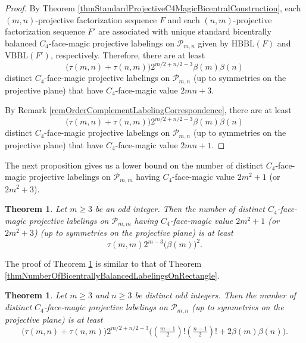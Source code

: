 \documentclass[12pt]{amsart}
\theoremstyle{definition}
\theoremstyle{plain}
\newtheorem{theorem}[definition]{Theorem}
\begin{document}
\begin{proof}
  By Theorem \ref{thmStandardProjectiveC4MagicBicentralConstruction}, each $(m,n)$-projective factorization sequence
  $F$ and each $(n,m)$-projective factorization sequence $F'$ are associated with unique standard
  bicentrally balanced $C_4$-face-magic projective labelings on $\mathcal{P}_{m,n}$
  given by $\mathrm{HBBL}(F)$ and $\mathrm{VBBL}(F')$, respectively.
  Therefore, there are at least
  \begin{equation*}
    \bigl( \tau(m,n) + \tau(n,m) \bigr) 2^{m/2 +n/2-3}  \beta(m) \allowbreak \beta(n)
  \end{equation*}
  distinct $C_4$-face-magic projective labelings on $\mathcal{P}_{m,n}$ (up to symmetries on the projective plane) that have $C_4$-face-magic value $2mn+3$.

  By Remark \ref{remOrderComplementLabelingCorrespondence}, there are at least
  \begin{equation*}
    \bigl( \tau(m,n) + \tau(n,m) \bigr) 2^{m/2 +n/2-3}  \beta(m) \allowbreak \beta(n)
  \end{equation*}
  distinct $C_4$-face-magic projective labelings on $\mathcal{P}_{m,n}$ (up to symmetries on the projective plane) that have $C_4$-face-magic value $2mn+1$.
\end{proof}

The next proposition gives us a lower bound on the number of distinct
$C_4$-face-magic projective labelings on $\mathcal{P}_{m,m}$ having $C_4$-face-magic value $2m^2 +1$ (or $2m^2 +3$).

\begin{theorem}   \label{thmNumberOfBicentrallyBalancedLabelingsOnSquare}
  Let $m \geqslant 3$ be an odd integer.
  Then the number of distinct $C_4$-face-magic projective labelings on $\mathcal{P}_{m,m}$ having $C_4$-face-magic value $2m^2 +1$ (or $2m^2 +3$)
  (up to symmetries on the projective plane) is at least
  \begin{equation*}
     \tau(m,m) 2^{m-3} \bigl( \beta(m) \bigr)^2.
  \end{equation*}
\end{theorem}

The proof of Theorem \ref{thmNumberOfBicentrallyBalancedLabelingsOnSquare} is similar to that of
Theorem \ref{thmNumberOfBicentrallyBalancedLabelingsOnRectangle}.

\begin{theorem} \label{thmNumberOfC4FaceMagicLabelingsOnRectangle}
  Let $m \geqslant 3$ and $n \geqslant 3$ be distinct odd integers.
  Then the number of distinct $C_4$-face-magic projective labelings on $\mathcal{P}_{m,n}$
  (up to symmetries on the projective plane) is at least
  \begin{equation*}
    \bigl(  \tau(m,n) + \tau(n,m) \bigr)   2^{m/2 +n/2-3} \bigl( (\tfrac{m-1}{2})! (\tfrac{n-1}{2})!   + 2 \beta(m)  \beta(n) \bigr).
  \end{equation*}
\end{theorem}
\end{document}
